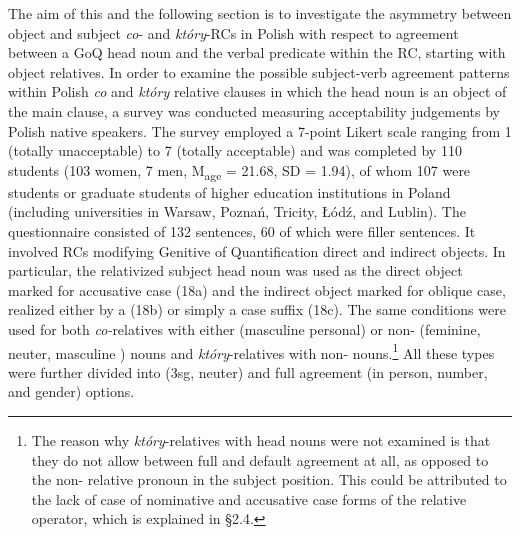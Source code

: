 \documentclass[output=paper]{langsci/langscibook}
\begin{document}
The aim of this and the following section is to investigate the asymmetry between object and subject \textit{co}{}- and \textit{który}{}-RCs in Polish with respect to agreement between a GoQ head noun and the verbal predicate within the RC, starting with object relatives. In order to examine the possible subject-verb agreement patterns within Polish \textit{co} and \textit{który} relative clauses in which the head noun is an object of the main clause, a survey was conducted measuring acceptability judgements by Polish native speakers. The survey employed a 7-point Likert scale ranging from 1 (totally unacceptable) to 7 (totally acceptable) and was completed by 110 students (103 women, 7 men, M\textsubscript{age} = 21.68, SD = 1.94), of whom 107 were students or graduate students of higher education institutions in Poland (including universities in Warsaw, Poznań, Tricity, Łódź, and Lublin). The questionnaire consisted of 132 sentences, 60 of which were filler sentences. It involved RCs modifying Genitive of Quantification direct and indirect objects. In particular, the relativized subject head noun was used as the direct object marked for accusative case (18a) and the indirect object marked for oblique case, realized either by a  (18b) or simply a case suffix (18c). The same conditions were used for both \textit{co-}relatives with either  (masculine personal) or non- (feminine, neuter, masculine ) nouns and \textit{który}{}-relatives with non- nouns.\footnote{The reason why \textit{który}{}-relatives with  head nouns were not examined is that they do not allow  between full and default agreement at all, as opposed to the non- relative pronoun in the subject position. This could be attributed to the lack of case  of nominative and accusative case forms of the  relative operator, which is explained in §2.4.} All these types were further divided into  (3sg, neuter) and full agreement (in person, number, and gender) options.
\end{document}
